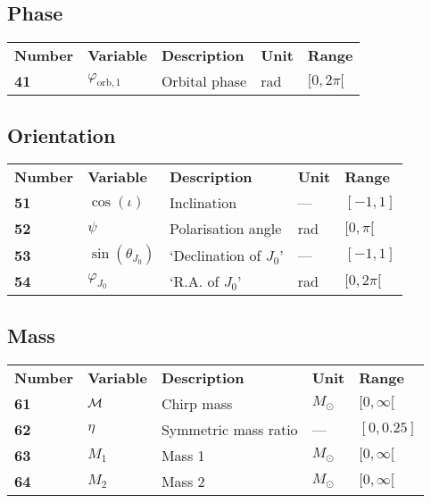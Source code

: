 \documentclass[10pt]{article}
\begin{document}
\subsection{Phase}
\begin{tabular}{lllll}
  \textbf{Number} & \textbf{Variable} & \textbf{Description} & \textbf{Unit} & \textbf{Range} \\
  \textbf{41} & $\varphi_\mathrm{orb,1}$  & Orbital phase & rad & $[0,2\pi[$ \\
\end{tabular}

\subsection{Orientation}
\begin{tabular}{lllll}
  \textbf{Number} & \textbf{Variable} & \textbf{Description} & \textbf{Unit} & \textbf{Range} \\
  \textbf{51} & $\cos(\iota)$  & Inclination & --- & $[-1,1]$ \\
  \textbf{52} & $\psi$  & Polarisation angle & rad & $[0,\pi[$ \\
  \textbf{53} & $\sin(\theta_{J_0})$ & `Declination of $J_0$' & --- & $[-1,1]$ \\
  \textbf{54} & $\varphi_{J_0}$  & `R.A. of $J_0$' & rad & $[0,2\pi[$ \\
\end{tabular}

\subsection{Mass}
\begin{tabular}{lllll}
  \textbf{Number} & \textbf{Variable} & \textbf{Description} & \textbf{Unit} & \textbf{Range} \\
  \textbf{61} & $\cal{M}$  & Chirp mass & $M_\odot$ & $[0,\infty[$ \\
  \textbf{62} & $\eta$  & Symmetric mass ratio & --- & $[0,0.25]$ \\
  \textbf{63} & $M_1$  & Mass 1 & $M_\odot$ & $[0,\infty[$ \\
  \textbf{64} & $M_2$  & Mass 2 & $M_\odot$ &  $[0,\infty[$ \\
\end{tabular}
\end{document}
